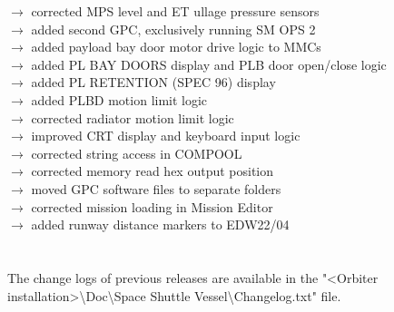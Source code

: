 \documentclass[Space_Shuttle_Vessel_Manual.tex]{subfiles}
\begin{document}
$\rightarrow$ corrected MPS level and ET ullage pressure sensors\\
$\rightarrow$ added second GPC, exclusively running SM OPS 2\\
$\rightarrow$ added payload bay door motor drive logic to MMCs\\
$\rightarrow$ added PL BAY DOORS display and PLB door open/close logic\\
$\rightarrow$ added PL RETENTION (SPEC 96) display\\
$\rightarrow$ added PLBD motion limit logic\\
$\rightarrow$ corrected radiator motion limit logic\\
$\rightarrow$ improved CRT display and keyboard input logic\\
$\rightarrow$ corrected string access in COMPOOL\\
$\rightarrow$ corrected memory read hex output position\\
$\rightarrow$ moved GPC software files to separate folders\\
$\rightarrow$ corrected mission loading in Mission Editor\\
$\rightarrow$ added runway distance markers to EDW22/04\\
\\
\\
The change logs of previous releases are available in the "<Orbiter installation>\textbackslash Doc\textbackslash Space Shuttle Vessel\textbackslash Changelog.txt" file.
\end{document}
